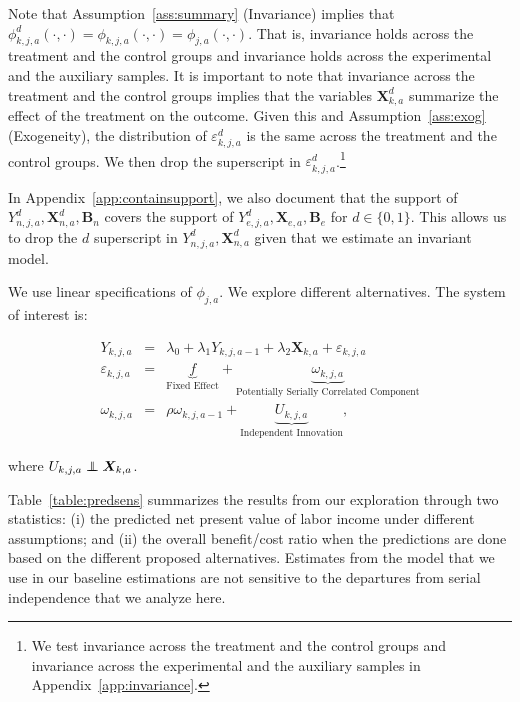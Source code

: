 Note that Assumption~\ref{ass:summary} (Invariance) implies that $\phi_{k,j,a}^d \left (\cdot, \cdot \right) = \phi_{k,j,a}  \left (\cdot, \cdot \right) = \phi_{j,a}  \left (\cdot, \cdot \right)$. That is, invariance holds across the treatment and the control groups and invariance holds across the experimental and the auxiliary samples. It is important to note that invariance across the treatment and the control groups implies that the variables $\bm{X}_{k,a}^d$ summarize the effect of the treatment on the outcome. Given this and Assumption~\ref{ass:exog} (Exogeneity), the distribution of $\varepsilon_{k,j,a}^d$ is the same across the treatment and the control groups. We then drop the superscript in $\varepsilon_{k,j,a}^d$.\footnote{We test invariance across the treatment and the control groups and invariance across the experimental and the auxiliary samples  in Appendix~\ref{app:invariance}.}

In Appendix~\ref{app:containsupport}, we also document that the support of $Y_{n,j,a}^d, \bm{X}_{n,a}^d, \bm{B}_{n}$ covers the support of $Y_{e,j,a}^d, \bm{X}_{e,a}, \bm{B}_{e}$ for $d \in \{0, 1\}$. This allows us to drop the $d$ superscript in $Y_{n,j,a}^d, \bm{X}_{n,a}^d$ given that we estimate an invariant model.

We use linear specifications of $\phi_{j,a}$. We explore different alternatives. The system of interest is:

\begin{eqnarray}
Y_{k,j,a}                   &=& \lambda_{0} + \lambda_{1} Y_{k,j,a-1} + \lambda_{2}  \bm{X}_{k,a} + \varepsilon_{k,j,a} \nonumber \\
\varepsilon_{k,j,a} &=& \underbrace{f}_{\text{Fixed Effect}} + \underbrace{\omega_{k,j,a}}_{\text{Potentially Serially Correlated Component}} \nonumber \\
\omega_{k,j,a}      &=& \rho \omega_{k,j,a-1} + \underbrace{U_{k,j,a}}_{\text{Independent Innovation}},
\end{eqnarray}

\noindent where $U_{k,j,a} \independent \bm{X}_{k,a}$.

Table~\ref{table:predsens} summarizes the results from our exploration through two statistics: (i) the predicted net present value of labor income under different assumptions; and (ii) the overall benefit/cost ratio when the predictions are done based on the different proposed alternatives. Estimates from the model that we use in our baseline estimations are not sensitive to the departures from serial independence that we analyze here.

